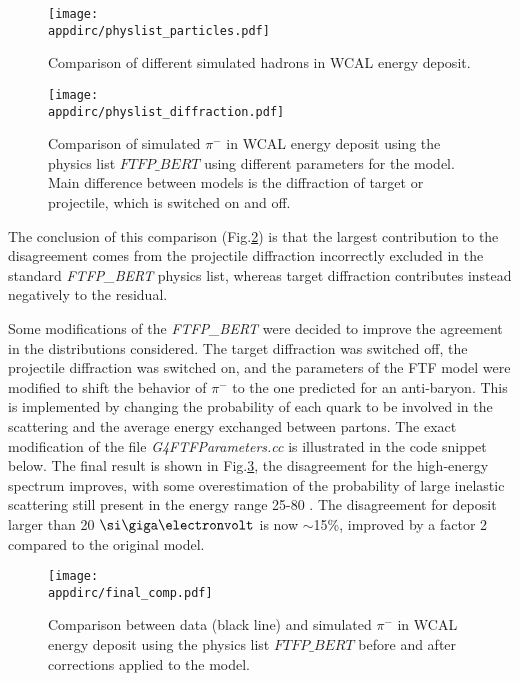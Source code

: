 \begin{figure}[tbh!]
  \centering
  \texttt{[image: \\appdirc/physlist\_particles.pdf]}
  \caption[Comparison of different simulated hadrons in WCAL energy spectrum]{Comparison of different simulated hadrons in WCAL energy deposit.}
  \label{fig:geant4-hadron-particles}
\end{figure}

\begin{figure}[tbh!]
  \centering
  \texttt{[image: \\appdirc/physlist\_diffraction.pdf]}
  \caption[Comparison of different diffraction limits for hadrons in WCAL energy spectrum]{Comparison of simulated $\pi^-$ in WCAL energy deposit using the physics list $FTFP\_BERT$ using different parameters for the model. Main difference between models is the diffraction of target or projectile, which is switched on and off.}
  \label{fig:geant4-hadron-diff}
\end{figure}

The conclusion of this comparison (Fig.\ref{fig:geant4-hadron-diff}) is that the largest contribution to the disagreement comes from the projectile diffraction incorrectly excluded in the standard \textit{FTFP\_BERT} physics list, whereas target diffraction contributes instead negatively to the residual.

Some modifications of the \textit{FTFP\_BERT} were decided to improve the agreement in the distributions considered. The target diffraction was switched off, the projectile diffraction was switched on, and the parameters of the FTF model were modified to shift the behavior of $\pi^-$ to the one predicted for an anti-baryon. This is implemented by changing the probability of each quark to be involved in the scattering and the average energy exchanged between partons. The exact modification of the file \textit{G4FTFParameters.cc} is illustrated in the code snippet below. The final result is shown in Fig.\ref{fig:geant4-hadron-final}, the disagreement for the high-energy spectrum improves, with some overestimation of the probability of large inelastic scattering still present in the energy range 25-80 \gev. The disagreement for deposit larger than 20 $\gev$ is now $\sim$15\%, improved by a factor 2 compared to the original model.

\begin{figure}[tbh!]
  \centering
  \texttt{[image: \\appdirc/final\_comp.pdf]}
  \caption[Comparison of hadron energy deposit after corrections]{Comparison between data (black line) and simulated $\pi^-$ in WCAL energy deposit using the physics list $FTFP\_BERT$ before and after corrections applied to the model.}
  \label{fig:geant4-hadron-final}
\end{figure}

